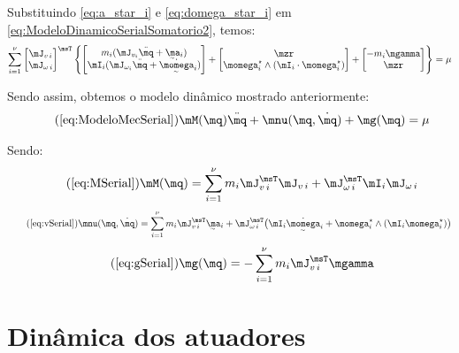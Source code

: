\documentclass[]{politex}
\begin{document}
Substituindo \eqref{eq:a_star_i} e  \eqref{eq:domega_star_i} em \eqref{eq:ModeloDinamicoSerialSomatorio2}, temos:
\begin{equation}
\sum_{i=1}^\nu
\begin{bmatrix}
\mJ_{v\,i} \\
\mJ_{\omega\,i}
\end{bmatrix}^\msT
\begin{Bmatrix}
\begin{bmatrix}
m_i (\mJ_{v_i} \ddot{\mq} + \underaccent{\sim}{\ma}_i   )  \\
 \mI_i (\mJ_{\omega_i} \ddot{\mq} + \underaccent{\sim}{\dot{\momega}}_i )
\end{bmatrix}
+
\begin{bmatrix}
\mzr \\
\momega^\star_i \wedge (\mI_i \cdot \momega^\star_i)
\end{bmatrix}
+
\begin{bmatrix}
-m_i \mgamma \\
\mzr
\end{bmatrix}
\end{Bmatrix}
=\mu
\end{equation}

Sendo assim, obtemos o modelo dinâmico mostrado anteriormente:
\begin{equation} \tag{\ref{eq:ModeloMecSerial}}
\mM(\mq) \ddot{\mq} + \mnu(\mq,\dot{\mq}) + \mg(\mq) = \mu
\end{equation}

Sendo:
\begin{equation} \tag{\ref{eq:MSerial}}
\mM(\mq) = \sum_{i=1}^\nu
m_i \mJ_{v\,i}^\msT \mJ_{v\,i} + \mJ_{\omega\,i}^\msT \mI_i \mJ_{\omega\,i}
\end{equation}
\begin{equation} \tag{\ref{eq:vSerial}}
\mnu(\mq, \dot{\mq}) = \sum_{i=1}^\nu
 m_i \mJ_{v\,i}^\msT \underaccent{\sim}{\ma}_i + \mJ_{\omega\,i}^\msT \big( \mI_i \underaccent{\sim}{\dot{\momega}}_i + \momega^\star_i \wedge (\mI_i  \momega^\star_i) \big)
\end{equation}
\begin{equation} \tag{\ref{eq:gSerial}}
\mg(\mq) = - \sum_{i=1}^\nu m_i \mJ_{v\,i}^\msT \mgamma
\end{equation}

\section{Dinâmica dos atuadores} \label{S05-3}
\end{document}
